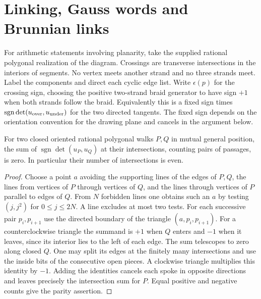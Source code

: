\section{Linking, Gauss words and Brunnian links}
\label{sec:linking-surface}

For arithmetic statements involving planarity, take the supplied rational
polygonal realization of the diagram. Crossings are transverse intersections
in the interiors of segments. No vertex meets another strand and no three
strands meet. Label the components and direct each cyclic edge list.
Write $\epsilon(p)$ for the crossing sign, choosing the positive two-strand
braid generator to have sign $+1$ when both strands follow the braid.
Equivalently this is a fixed sign times
$\operatorname{sgn}\det(u_{\rm over},u_{\rm under})$ for the two
directed tangents. The fixed sign depends on the orientation convention
for the drawing plane and cancels in the argument below.

\begin{lemma}
\label{lem:rational-mixed}
For two closed oriented rational polygonal walks $P,Q$ in mutual general
position, the sum of $\operatorname{sgn}\det(u_P,u_Q)$ at their
intersections, counting pairs of passages, is zero. In particular their
number of intersections is even.
\end{lemma}
\begin{proof}
Choose a point $a$ avoiding the supporting lines of the edges of $P,Q$,
the lines from vertices of $P$ through vertices of $Q$, and the lines
through vertices of $P$ parallel to edges of $Q$. From $N$ forbidden lines
one obtains such an $a$ by testing $(j,j^2)$ for $0\leq j\leq2N$.
A line excludes at most two tests. For each successive pair $p_i,p_{i+1}$
use the directed boundary of the triangle $(a,p_i,p_{i+1})$.
For a counterclockwise triangle the summand is $+1$ when $Q$ enters
and $-1$ when it leaves, since its interior lies to the left of each edge.
The sum telescopes to zero along closed $Q$. One may split its edges at
the finitely many intersections and use the inside bits of the consecutive
open pieces. A clockwise triangle multiplies this identity by $-1$.
Adding the identities cancels each spoke in opposite directions and
leaves precisely the intersection sum for $P$. Equal positive and negative
counts give the parity assertion.
\end{proof}

